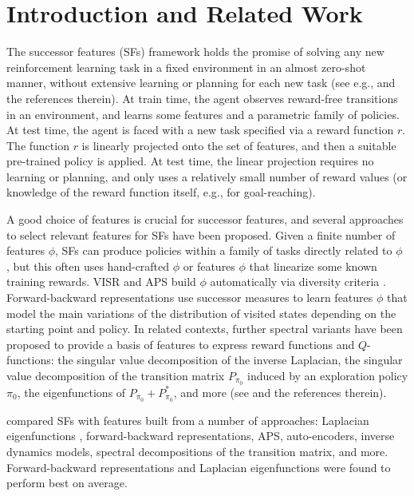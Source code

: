 \documentclass[11pt,a4paper]{article}
\begin{document}
\section{Introduction and Related Work}

The successor features (SFs) framework holds the promise of solving any
new reinforcement learning task in a fixed environment in an almost
zero-shot manner, without extensive learning or planning for each new
task (see e.g., \cite{borsa2018universal,zeroshot,allpolicies} and the
references therein). At train time, the agent observes reward-free
transitions in an environment, and learns some features and a parametric
family of policies. At test time, the agent is faced with a new task
specified via a reward function $r$. The function $r$ is linearly
projected onto the set of features, and then a suitable pre-trained
policy is applied. At test time, the linear projection requires no
learning or planning, and only uses a relatively small number of reward
values (or knowledge of the reward function itself, e.g., for
goal-reaching).

A good choice of features is crucial for successor features, and several
approaches to select relevant features for SFs have been proposed.  Given
a finite number of features $\phi$, SFs can produce policies within a
family of tasks directly related to $\phi$
\cite{barreto2017successor,borsa2018universal,zhang2017deep,grimm2019disentangled},
but this often uses hand-crafted $\phi$ or features $\phi$ that linearize
some known training rewards.  VISR and APS
\cite{hansen2019fast,liu2021aps} build $\phi$ automatically via diversity
criteria \cite{eysenbach2018diversity,gregor2016variational}.
Forward-backward representations \cite{allpolicies,zeroshot} use
successor measures \cite{successorstates} to learn features $\phi$ that
model the main variations of the distribution of visited states depending
on the starting point and policy.  In related contexts, further spectral
variants have been proposed to provide a basis of features to express
reward functions and $Q$-functions: the singular value decomposition of
the inverse Laplacian, the singular value decomposition of the transition
matrix $P_{\pi_0}$ induced by an exploration policy $\pi_0$, the
eigenfunctions of $P_{\pi_0}+ P^\ast_{\pi_0}$, and more (see
\cite{ghosh2020representations, ren2022spectral} and the references
therein).

\cite{zeroshot} compared SFs with features built from a number of
approaches: Laplacian
eigenfunctions \cite{wu2018laplacian,mahadevan2007proto},
forward-backward representations, APS,
auto-encoders, inverse
dynamics models, spectral decompositions of the transition matrix, and
more.
Forward-backward representations and Laplacian eigenfunctions were found
to perform best on average.
\end{document}
